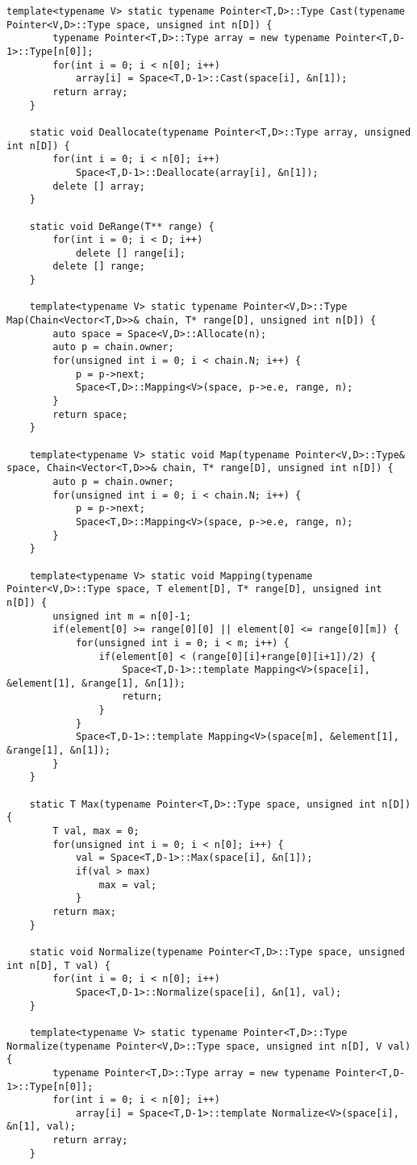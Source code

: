 \documentclass[11pt,english,a4paper]{article}
\begin{document}
\begin{flushleft}
\begin{lstlisting}[title={\texttt{struct Space}}]
	template<typename V> static typename Pointer<T,D>::Type Cast(typename Pointer<V,D>::Type space, unsigned int n[D]) {
		typename Pointer<T,D>::Type array = new typename Pointer<T,D-1>::Type[n[0]];
		for(int i = 0; i < n[0]; i++)
			array[i] = Space<T,D-1>::Cast(space[i], &n[1]);
		return array;
	}
	
	static void Deallocate(typename Pointer<T,D>::Type array, unsigned int n[D]) {
		for(int i = 0; i < n[0]; i++)
			Space<T,D-1>::Deallocate(array[i], &n[1]);
		delete [] array;
	}
	
	static void DeRange(T** range) {
		for(int i = 0; i < D; i++)
			delete [] range[i];
		delete [] range;
	}
	
	template<typename V> static typename Pointer<V,D>::Type Map(Chain<Vector<T,D>>& chain, T* range[D], unsigned int n[D]) {
		auto space = Space<V,D>::Allocate(n);
		auto p = chain.owner;
		for(unsigned int i = 0; i < chain.N; i++) {
			p = p->next;
			Space<T,D>::Mapping<V>(space, p->e.e, range, n);
		}
		return space;
	}
	
	template<typename V> static void Map(typename Pointer<V,D>::Type& space, Chain<Vector<T,D>>& chain, T* range[D], unsigned int n[D]) {
		auto p = chain.owner;
		for(unsigned int i = 0; i < chain.N; i++) {
			p = p->next;
			Space<T,D>::Mapping<V>(space, p->e.e, range, n);
		}
	}
	
	template<typename V> static void Mapping(typename Pointer<V,D>::Type space, T element[D], T* range[D], unsigned int n[D]) {
		unsigned int m = n[0]-1;
		if(element[0] >= range[0][0] || element[0] <= range[0][m]) {
			for(unsigned int i = 0; i < m; i++) {
				if(element[0] < (range[0][i]+range[0][i+1])/2) {
					Space<T,D-1>::template Mapping<V>(space[i], &element[1], &range[1], &n[1]);
					return;
				}
			}
			Space<T,D-1>::template Mapping<V>(space[m], &element[1], &range[1], &n[1]);
		}
	}
	
	static T Max(typename Pointer<T,D>::Type space, unsigned int n[D]) {
		T val, max = 0;
		for(unsigned int i = 0; i < n[0]; i++) {
			val = Space<T,D-1>::Max(space[i], &n[1]);
			if(val > max)
				max = val;
			}
		return max;
	}
	
	static void Normalize(typename Pointer<T,D>::Type space, unsigned int n[D], T val) {
		for(int i = 0; i < n[0]; i++)
			Space<T,D-1>::Normalize(space[i], &n[1], val);
	}
	
	template<typename V> static typename Pointer<T,D>::Type Normalize(typename Pointer<V,D>::Type space, unsigned int n[D], V val) {
		typename Pointer<T,D>::Type array = new typename Pointer<T,D-1>::Type[n[0]];
		for(int i = 0; i < n[0]; i++)
			array[i] = Space<T,D-1>::template Normalize<V>(space[i], &n[1], val);
		return array;
	}
	

\end{lstlisting}
\end{flushleft}
\end{document}
